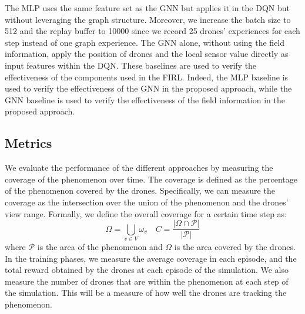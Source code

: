 The \ac{MLP} uses the same feature set as the \ac{GNN} but applies it in the \ac{DQN} but 
without leveraging the graph structure. Moreover, we increase the batch size to 512 and the replay buffer to 10000 since we record 25 drones' experiences for each step instead of one graph experience.
%
The \ac{GNN} alone, without using the field information, apply the position of drones and the local sensor value directly as input features within the \ac{DQN}.
%
These baselines are used to verify the effectiveness of the components used in the FIRL. 
%
Indeed, the \ac{MLP} baseline is used to verify the effectiveness of the \ac{GNN} in the proposed approach, while the \ac{GNN} baseline is used to verify the effectiveness of the field information in the proposed approach.
\subsection{Metrics}
We evaluate the performance of the different approaches by measuring the coverage of the phenomenon over time.
%
The coverage is defined as the percentage of the phenomenon covered by the drones.
%
Specifically, we can measure the coverage as the intersection over the union of the phenomenon and the drones' view range.
%
Formally, we define the overall coverage for a certain time step as:
\begin{equation*}
\Omega = \bigcup_{v \in V} \omega_v
\quad 
C = \frac{|\Omega \cap \mathcal{P}|}{|\mathcal{P}|}
\end{equation*}
where $\mathcal{P}$ is the area of the phenomenon and $\Omega$ is the area covered by the drones.
In the training phases, 
 we measure the average coverage in each episode, and the total reward obtained by the drones at each episode of the simulation. 
%
We also measure the number of drones that are within the phenomenon at each step of the simulation.
This will be a measure of how well the drones are tracking the phenomenon.

